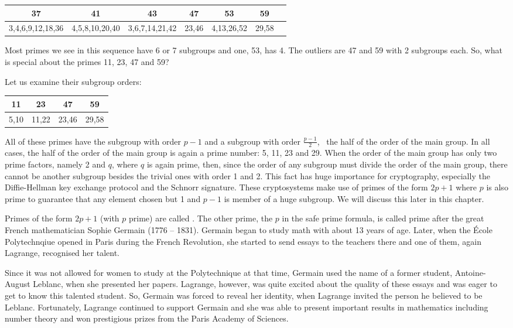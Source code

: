 \documentclass{scrreprt}
\begin{document}
\begin{tabular}{c|c|c|c|c|c|c}
           37    & 41             &  43            &    47 &         53 &    59 \\\hline
3,4,6,9,12,18,36 & 4,5,8,10,20,40 & 3,6,7,14,21,42 & 23,46 & 4,13,26,52 & 29,58
\end{tabular}

Most primes we see in this sequence have
6 or 7 subgroups and one, 53, has 4.
The outliers are 47 and 59 with 2 subgroups each.
So, what is special about the primes
11, 23, 47 and 59?

Let us examine their subgroup orders:

\begin{tabular}{c|c|c|c}
  11 & 23    &    47 &    59 \\\hline
5,10 & 11,22 & 23,46 & 29,58 
\end{tabular}

All of these primes have
the subgroup with order $p-1$ and a
subgroup with order $\frac{p-1}{2}$,
\ie\ the half of the order of the main group.
In all cases, the half of the order 
of the main group is again a prime number:
5, 11, 23 and 29.
When the order of the main group
has only two prime factors,
namely 2 and $q$, where $q$ is again prime,
then, since the order of any subgroup must 
divide the order of the main group,
there cannot be another subgroup
besides the trivial ones with order 1 and 2.
This fact has huge importance
for cryptography, especially the 
Diffie-Hellman key exchange protocol
and the Schnorr signature.
These cryptosystems make use of 
primes of the form $2p+1$ where $p$ is also prime
to guarantee that any element chosen
but 1 and $p-1$ is member of a huge 
subgroup. We will discuss this later in this chapter.

Primes of the form $2p+1$ (with $p$ prime) are
called .
The other prime, the $p$ in the safe prime formula,
is called  prime
after the great French mathematician 
Sophie Germain (1776 -- 1831).
Germain began to study math with about 13 years of age.
Later, when the École Polytechnqiue opened in Paris
during the French Revolution,
she started to send essays 
to the teachers there and one of them,
again Lagrange, 
recognised her talent.

Since it was not allowed for women to study at the Polytechnique
at that time, Germain used the name of a former student,
Antoine-August Leblanc, when she presented her papers.
Lagrange, however, was quite excited about the quality of these essays
and was eager to get to know this talented student.
So, Germain was forced to reveal her identity,
when Lagrange invited the person
he believed to be Leblanc.
Fortunately, Lagrange continued to support Germain
and she was able to present important results
in mathematics including number theory and won prestigious prizes
from the Paris Academy of Sciences.
\end{document}
